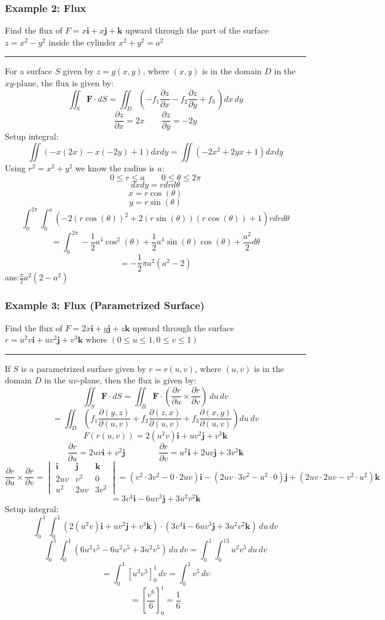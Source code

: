 \subsubsection{Example 2: Flux}
Find the flux of $F=x\mathbf{i}+x\mathbf{j}+\mathbf{k}$ upward through the part of the surface $z=x^2-y^2$
inside the cylinder $x^2+y^2=a^2$

\rule{\textwidth}{0.5pt}

For a surface $S$ given by $z=g(x,y)$, where $(x,y)$ is in the domain $D$ in the $xy$-plane, the flux is given by:
$$\iint_{S}\mathbf{F}\cdot d S=\iint_D\left(-f_{1}\frac{\partial z}{\partial x}-f_{2}\frac{\partial z}{\partial y}+f_{3}\,\right)d x\,d y$$
$$\frac{\partial z}{\partial x}=2x\qquad\frac{\partial z}{\partial y}=-2y$$
Setup integral:
$$\iint (-x(2x)-x(-2y)+1)dxdy=\iint (-2x^2+2yx+1)dxdy$$
Using $r^2=x^2+y^2$ we know the radius is $a$:
$$0\leq r\leq a\qquad 0\leq \theta\leq 2\pi$$
$$dxdy=rdrd\theta$$
$$x=r\cos(\theta)$$
$$y=r\sin(\theta)$$
$$\int_0^{2\pi}\int_0^{a} (-2(r\cos(\theta))^2+2(r\sin(\theta))(r\cos(\theta))+1)rdrd\theta$$
$$=\int_0^{2\pi}-\frac{1}{2} a^4 \cos ^2(\theta)+\frac{1}{2} a^4 \sin (\theta) \cos (\theta)+\frac{a^2}{2}d\theta$$
$$=-\frac{1}{2} \pi  a^2 \left(a^2-2\right)$$
ans:$\frac{\pi}{2}a^{2}(2-a^{2})$

\subsubsection{Example 3: Flux (Parametrized Surface)}
Find the flux of $F=2x\mathbf{i}+y\mathbf{j}+z\mathbf{k}$ upward through the surface $r=u^2v\mathbf{i}+uv^2\mathbf{j}+v^3\mathbf{k}$ where $(0\leq u\leq1,0\leq v\leq1)$ 

\rule{\textwidth}{0.5pt}

If $S$ is a parametrized surface given by $r=r(u,v)$, where $(u,v)$ is in the domain $D$ in the $uv$-plane, then the flux is given by:
$$\iint_{S}\mathbf{F}\cdot d S=\iint_{B}\mathbf{F}\cdot\left({\frac{\partial r}{\partial u}}\times{\frac{\partial r}{\partial v}}\right)\,d u\,d v$$
$$=\iint_D\left(f_1\frac{\partial (y,z)}{\partial (u,v)}+f_2\frac{\partial (z,x)}{\partial (u,v)}+f_3\frac{\partial (x,y)}{\partial (u,v)}\right)du\ dv$$
$$F(r(u,v))=2(u^2v)\mathbf{i}+uv^2\mathbf{j}+v^3\mathbf{k}$$
$$\frac{\partial r}{\partial u}=2uv\mathbf{i}+v^2\mathbf{j}\qquad\qquad\frac{\partial r}{\partial v}=u^2\mathbf{i}+2uv\mathbf{j}+3v^2\mathbf{k}$$
$${\frac{\partial r}{\partial u}}\times{\frac{\partial r}{\partial v}}=\begin{vmatrix}
  \mathbf{i}&\mathbf{j}&\mathbf{k}\\ 
  2uv&v^2&0\\
  u^2&2uv&3v^2
\end{vmatrix}=(v^2\cdot 3v^2-0\cdot 2uv)\mathbf{i}-(2uv\cdot 3v^2-u^2\cdot 0)\mathbf{j}+(2uv\cdot 2uv-v^2\cdot u^2)\mathbf{k}$$
$$=3v^4\mathbf{i}-6uv^3\mathbf{j}+3u^2v^2\mathbf{k}$$
Setup integral:
$$\int_{0}^1\int_0^1(2(u^2v)\mathbf{i}+uv^2\mathbf{j}+v^3\mathbf{k})\cdot\left(3v^4\mathbf{i}-6uv^3\mathbf{j}+3u^2v^2\mathbf{k}\right)\,d u\,d v$$
$$\int_{0}^1\int_0^1(6u^2v^5-6u^2v^5+3u^2v^5)\,d u\,d v=\int_{0}^1\int_0^13u^2v^5\,d u\,d v$$
$$=\int_{0}^1\left[u^3v^5\right]_0^1\,d v=\int_{0}^1v^5\,d v$$
$$=\left[\displaystyle\frac{v^6}{6}\right]_0^1=\boxed{\frac{1}{6}}$$

